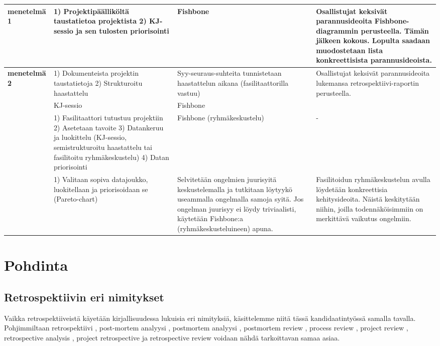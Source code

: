\begin{center}
\begin{longtable}{|p{3cm}|p{4cm}|p{4cm}|p{4cm}|}
	\textbf{\citep{staalhane2003post} menetelmä 1} & 1) Projektipäälliköltä taustatietoa projektista 2) KJ-sessio ja sen tulosten priorisointi & Fishbone & Osallistujat keksivät parannusideoita Fishbone-diagrammin perusteella. Tämän jälkeen kokous. Lopulta saadaan muodostetaan lista konkreettisista parannusideoista. \\ \hline
	\textbf{\citep{staalhane2003post} menetelmä 2} & 1) Dokumenteista projektin taustatietoja 2) Strukturoitu haastattelu & Syy-seuraus-suhteita tunnistetaan haastattelun aikana (fasilitaattorilla vastuu) & Osallistujat keksivät parannusideoita lukemansa retrospektiivi-raportin perusteella. \\ \hline
	\textbf{\citep{dingsoyr2003extending}} & KJ-sessio & Fishbone &  \\ \hline
	\textbf{\citep{birk2002postmortem}} & 1) Fasilitaattori tutustuu projektiin 2) Asetetaan tavoite 3) Datankeruu ja luokittelu (KJ-sessio,  semistrukturoitu haastattelu tai fasilitoitu ryhmäkeskustelu) 4) Datan priorisointi & Fishbone (ryhmäkeskustelu) & - \\ \hline
	\textbf{\citep{card1998learning}} & 1) Valitaan sopiva datajoukko, luokitellaan ja priorisoidaan se (Pareto-chart) & Selvitetään ongelmien juurisyitä keskustelemalla ja tutkitaan löytyykö useammalla ongelmalla samoja syitä. Jos ongelman juurisyy ei löydy triviaalisti, käytetään Fishbone:a (ryhmäkeskusteluineen) apuna. & Fasilitoidun ryhmäkeskustelun avulla löydetään konkreettisia kehitysideoita. Näistä keskitytään niihin, joilla todennäköisimmiin on merkittävä vaikutus ongelmiin. \\ \hline
\end{longtable}
\end{center}

\section{Pohdinta}

\subsection{Retrospektiivin eri nimitykset}
Vaikka retrospektiiveistä käyetään kirjallisuudessa lukuisia eri nimityksiä, käsittelemme niitä tässä kandidaatintyössä samalla tavalla. Pohjimmiltaan retrospektiivi \citep{AgileRetros2006}, post-mortem analyysi \citep{staalhane2003post}, postmortem analyysi \citep{de2004learning}, postmortem review \citep{dingsoyr2003extending}, process review \citep{karlsson2006case}, project review \citep{karlsson2006case}, retrospective analysis \citep{karlsson2006case}, project retrospective \citep{karlsson2006case} ja retrospective review \citep{karlsson2006case} voidaan nähdä tarkoittavan samaa asiaa.

